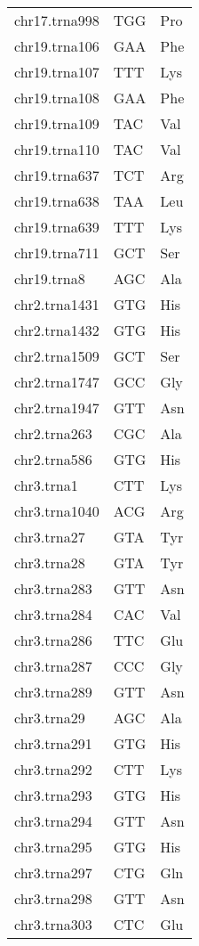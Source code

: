 \begin{longtable}{@{}l>{\collectcell\anticodon}l<{\endcollectcell}l@{}}
    chr17.trna998 & TGG & Pro \\
    chr19.trna106 & GAA & Phe \\
    chr19.trna107 & TTT & Lys \\
    chr19.trna108 & GAA & Phe \\
    chr19.trna109 & TAC & Val \\
    chr19.trna110 & TAC & Val \\
    chr19.trna637 & TCT & Arg \\
    chr19.trna638 & TAA & Leu \\
    chr19.trna639 & TTT & Lys \\
    chr19.trna711 & GCT & Ser \\
    chr19.trna8 & AGC & Ala \\
    chr2.trna1431 & GTG & His \\
    chr2.trna1432 & GTG & His \\
    chr2.trna1509 & GCT & Ser \\
    chr2.trna1747 & GCC & Gly \\
    chr2.trna1947 & GTT & Asn \\
    chr2.trna263 & CGC & Ala \\
    chr2.trna586 & GTG & His \\
    chr3.trna1 & CTT & Lys \\
    chr3.trna1040 & ACG & Arg \\
    chr3.trna27 & GTA & Tyr \\
    chr3.trna28 & GTA & Tyr \\
    chr3.trna283 & GTT & Asn \\
    chr3.trna284 & CAC & Val \\
    chr3.trna286 & TTC & Glu \\
    chr3.trna287 & CCC & Gly \\
    chr3.trna289 & GTT & Asn \\
    chr3.trna29 & AGC & Ala \\
    chr3.trna291 & GTG & His \\
    chr3.trna292 & CTT & Lys \\
    chr3.trna293 & GTG & His \\
    chr3.trna294 & GTT & Asn \\
    chr3.trna295 & GTG & His \\
    chr3.trna297 & CTG & Gln \\
    chr3.trna298 & GTT & Asn \\
    chr3.trna303 & CTC & Glu \\

\end{longtable}
